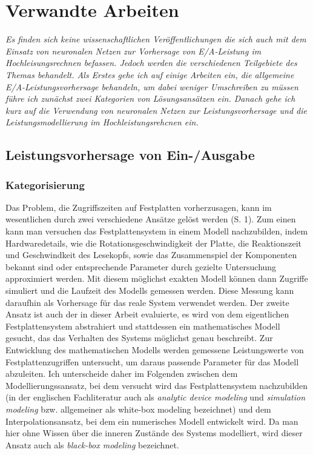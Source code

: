 \documentclass[
	12pt,
	a4paper,
	BCOR10mm,
	DIV14,
	listof=totoc,
	bibliography=totoc,
	headsepline
]{scrreprt}
\begin{document}
\chapter{Verwandte Arbeiten}
\textit{%
	Es finden sich keine wissenschaftlichen Veröffentlichungen die sich auch mit dem Einsatz von neuronalen Netzen zur Vorhersage von E/A-Leistung im Hochleisungsrechnen befassen. Jedoch werden die verschiedenen Teilgebiete des Themas behandelt. Als Erstes gehe ich auf einige Arbeiten ein, die allgemeine E/A-Leistungsvorhersage behandeln, um dabei weniger Umschreiben zu müssen führe ich zunächst zwei Kategorien von Lösungsansätzen ein. Danach gehe ich kurz auf die Verwendung von neuronalen Netzen zur Leistungsvorhersage und die Leistungsmodellierung im Hochleistungsrehcnen ein.
}
\bigskip

\section{Leistungsvorhersage von Ein-/Ausgabe}

\subsection{Kategorisierung}
Das Problem, die Zugriffszeiten auf Festplatten vorherzusagen, kann im wesentlichen durch zwei verschiedene Ansätze gelöst werden \cite{Crume:2013:FML:2538542.2538561} (S. 1). Zum einen kann man versuchen das Festplattensystem in einem Modell nachzubilden, indem Hardwaredetails, wie die Rotationsgeschwindigkeit der Platte, die Reaktionszeit und Geschwindkeit des Lesekopfs, sowie das Zusammenspiel der Komponenten bekannt sind oder entsprechende Parameter durch gezielte Untersuchung approximiert werden. Mit diesem möglichst exakten Modell können dann Zugriffe simuliert und die Laufzeit des Modells gemessen werden. Diese Messung kann daraufhin als Vorhersage für das reale System verwendet werden.
Der zweite Ansatz ist auch der in dieser Arbeit evaluierte, es wird von dem eigentlichen Festplattensystem abstrahiert und stattdessen ein mathematisches Modell gesucht, das das Verhalten des Systems möglichst genau beschreibt.
Zur Entwicklung des mathematischen Modells werden gemessene Leistungswerte von Festplattenzugriffen untersucht, um daraus passende Parameter für das Modell abzuleiten.
Ich unterscheide daher im Folgenden zwischen dem Modellierungssansatz, bei dem versucht wird das Festplattensystem nachzubilden (in der englischen Fachliteratur auch als \textit{analytic device modeling} und \textit{simulation modeling} bzw. allgemeiner als white-box modeling bezeichnet) und dem Interpolationsansatz, bei dem ein numerisches Modell entwickelt wird. Da man hier ohne Wissen über die inneren Zustände des Systems modelliert, wird dieser Ansatz auch als \textit{black-box modeling} bezeichnet. 
\end{document}
